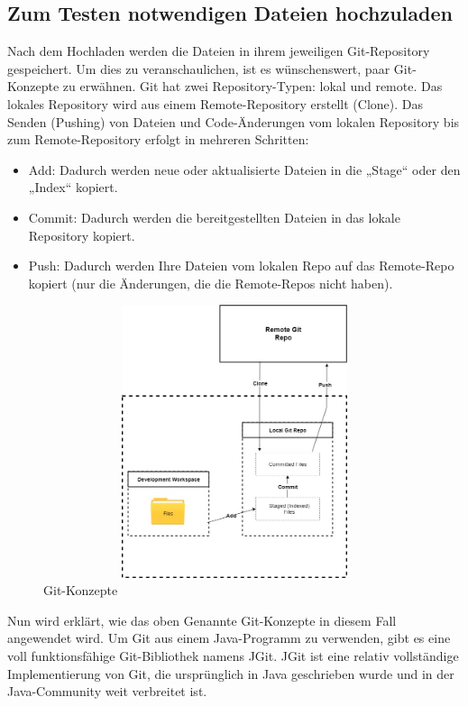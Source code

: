 \documentclass[a4paper,12pt,oneside]{book}
\begin{document}
\subsection{Zum Testen notwendigen Dateien hochzuladen}
Nach dem Hochladen werden die Dateien in ihrem jeweiligen Git-Repository gespeichert. Um dies zu veranschaulichen, ist es wünschenswert, paar Git-Konzepte zu erwähnen.
\newline
Git hat zwei Repository-Typen: lokal und remote. Das lokales Repository wird aus einem Remote-Repository erstellt (Clone). Das Senden (Pushing) von Dateien und Code-Änderungen vom lokalen Repository bis zum Remote-Repository erfolgt in mehreren Schritten: 
\begin{itemize}
	\item Add: Dadurch werden neue oder aktualisierte Dateien in die „Stage“ oder den „Index“ kopiert.
	\item Commit: Dadurch werden die bereitgestellten Dateien in das lokale Repository kopiert.
	\item Push: Dadurch werden Ihre Dateien vom lokalen Repo auf das Remote-Repo kopiert (nur die Änderungen, die die Remote-Repos nicht haben).
\end{itemize}
\begin{figure}[h!]
	\begin{center}
		\includegraphics[width=12cm, height=8cm]{Git-Konzept.jpg}
		\caption{Git-Konzepte} 
		\label{ Git-Konzepte} 
	\end{center}
\end{figure}
\newpage
Nun wird erklärt, wie das oben Genannte Git-Konzepte in diesem Fall angewendet wird. 
\newline
Um Git aus einem Java-Programm zu verwenden, gibt es eine voll funktionsfähige Git-Bibliothek namens JGit. JGit ist eine relativ vollständige Implementierung von Git, die ursprünglich in Java geschrieben wurde und in der Java-Community weit verbreitet ist.
\end{document}

